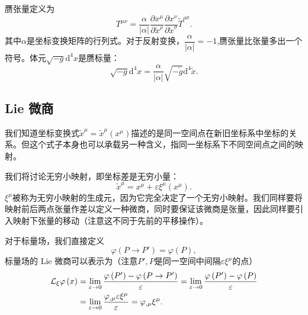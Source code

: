 \documentclass[11pt, a4paper, oneside, onecolumn]{ctexart}
\numberwithin{equation}{subsection}
\begin{document}
赝张量定义为
\begin{equation}
T^{\mu\nu}=\frac{\alpha}{\left\vert{}\alpha\right\vert{}}\frac{\partial{}x^{\mu}}{\partial{}\widetilde{x}^{\rho}}\frac{\partial{}x^{\nu}}{\partial{}\widetilde{x}^{\sigma}}\widetilde{T}^{\rho\sigma}.
\end{equation}
其中$\alpha$是坐标变换矩阵的行列式。对于反射变换，$\dfrac{\alpha}{\left\vert{}\alpha\right\vert{}}=-1$,赝张量比张量多出一个符号。体元$\sqrt{-g}\mathrm{d}^{4}x$是赝标量：
\begin{equation}
\sqrt{-g}\mathrm{d}^{4}x=\frac{\alpha}{\left\vert{}\alpha\right\vert{}}\sqrt{-\widetilde{g}}\mathrm{d}^{4}\widetilde{x}.
\end{equation}

\subsection{Lie 微商}
我们知道坐标变换式$\widetilde{x}^{\mu}=\widetilde{x}^{\mu}\left(x^{\mu}\right)$描述的是同一空间点在新旧坐标系中坐标的关系。但这个式子本身也可以承载另一种含义，指同一坐标系下不同空间点之间的映射。

我们将讨论无穷小映射，即坐标差是无穷小量：
\begin{equation}
\widetilde{x}^{\mu}=x^{\mu}+\varepsilon\xi^{\mu}\left(x^{\mu}\right).
\end{equation}
$\xi^{\mu}$被称为无穷小映射的生成元，因为它完全决定了一个无穷小映射。我们同样要将映射前后两点张量作差以定义一种微商，同时要保证该微商是张量，因此同样要引入映射下张量的移动（注意这不同于先前的平移操作）。

对于标量场，我们直接定义
\begin{equation}
\varphi\left(P\to P'\right)=\varphi\left(P\right),
\end{equation}
标量场的 Lie 微商可以表示为（注意$P',P$是同一空间中间隔$\varepsilon\xi^{\mu}$的点）
\begin{align}
\mathcal{L}_{\xi}\varphi\left(x\right)&=\lim_{\varepsilon\to0}\frac{\varphi\left(P'\right)-\varphi\left(P\to P'\right)}{\varepsilon}=\lim_{\varepsilon\to0}\frac{\varphi\left(P'\right)-\varphi\left(P\right)}{\varepsilon}\notag\\
&=\lim_{\varepsilon\to0}\frac{\varphi_{,\mu}\varepsilon\xi^{\mu}}{\varepsilon}=\varphi_{,\mu}\xi^{\mu}.
\end{align}
\end{document}

